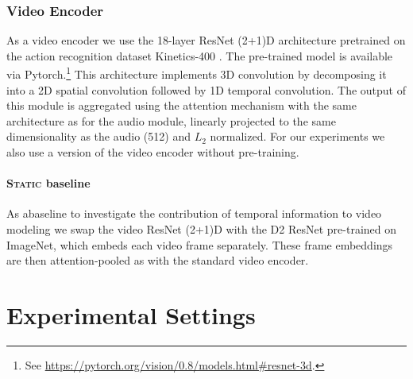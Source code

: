 \subsubsection{Video Encoder}
As a video encoder we use the 18-layer ResNet (2+1)D architecture
\citep{tran2018closer} pretrained on the action recognition dataset
Kinetics-400 \citep{DBLP:journals/corr/KayCSZHVVGBNSZ17}. The
pre-trained model is available via Pytorch.\footnote{See
  \url{https://pytorch.org/vision/0.8/models.html\#resnet-3d}.}  This
architecture implements 3D convolution by decomposing it into a 2D
spatial convolution followed by 1D temporal convolution.  The output
of this module is aggregated using the attention mechanism with the
same architecture as for the audio module, linearly projected to the
same dimensionality as the audio (512) and $L_2$ normalized.  For our
experiments we also use a version of the video encoder without
pre-training.

\paragraph{\textsc{Static} baseline}
As abaseline to investigate the contribution of temporal information to
video modeling we swap the video ResNet (2+1)D with the D2 ResNet
pre-trained on ImageNet, which embeds each video frame
separately. These frame embeddings are then attention-pooled as with
the standard video encoder. 


\section{Experimental Settings}
